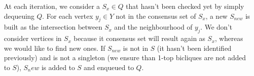 \documentclass[table]{report}
\begin{document}
At each iteration, we consider a $S_x \in Q$ that hasn't been checked yet by simply dequeuing $Q$. For each vertex $y_j \in Y$ not in the consensus set of $S_x$, a new $S_{new}$ is built as the intersection between $S_x$ and the neighbourhood of $y_j$. We don't consider vertices in $S_x$ because it consensus set will result again as $S_x$, whereas  we would like to find                                                                                                                                                                                                                                                                                                                                                                                                                                                                                                                                                                                                                                                                                                                                                                                                                                                                                                                                                                                                                                                                                                                                                                                                                                                                                                                                                                                                                                                                                                                                                                                                                                                                                                                                                                                                                                                                                                                                                                                                                                                                                                                                                                                                                                                                                                                                                                                                                                                                                                                                                                                                 new ones. If $S_{new}$ is not in $S$ (it hasn't been identified previously) and is not a singleton (we ensure than 1-top bicliques are not added to $S$), $S_new$ is added to $S$ and enqueued to $Q$. 
\end{document}
